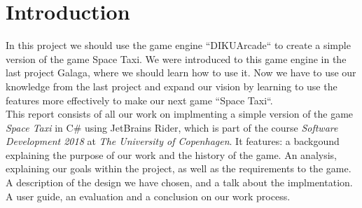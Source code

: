 \documentclass[../master.tex]{subfiles}
\begin{document}
\section{Introduction}
In this project we should use the game engine ``DIKUArcade`` to create a simple version of the game Space Taxi. We were introduced to this game engine in the last project Galaga, where we should learn how to use it. Now we have to use our knowledge from the last project and expand our vision by learning to use the features more effectively to make our next game ``Space Taxi``.\\

This report consists of all our work on implmenting a simple version of the game \textit{Space Taxi} in C\# using JetBrains Rider, which is part of the course \textit{Software Development 2018} at \textit{The University of Copenhagen}. It features: a backgound explaining the purpose of our work and the history of the game. An analysis, explaining our goals within the project, as well as the requirements to the game. A description of the design we have chosen, and a talk about the implmentation. A user guide, an evaluation and a conclusion on our work process.
\end{document}
